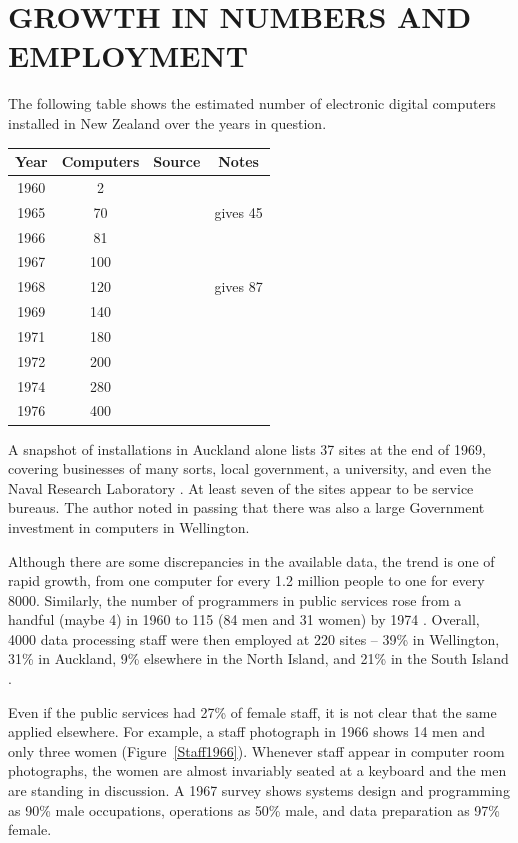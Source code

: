 \documentclass{IEEEcsmag}
\begin{document}
\vspace*{-8pt}
\section{GROWTH IN NUMBERS AND EMPLOYMENT}

The following table shows the estimated number of electronic digital computers installed in New Zealand over the years in question.

\begin{center}
\begin{tabular}{ |c|c|c|c| } 
 \hline
 Year & Computers & Source & Notes\\ 
\hline
1960 & 2 & \cite{FirstCinNZ}&\\ 
1965 & 70 & \cite{Beardon} & \cite{HoneHeke} gives 45\\ 
1966 & 81 & \cite{Beardon}&\\
1967 & 100 & \cite{ScottSurvey1967}&\\
1968 & 120 & \cite{Beardon} & \cite{Yearbook75} gives 87\\
1969 & 140 & \cite{Beardon}&\\
1971 & 180 & \cite{Beardon}&\\
1972 & 200 & \cite{Yearbook75}&\\
1974 & 280 & \cite{Beardon}&\\
1976 & 400 & \cite{Beardon}&\\
 \hline
\end{tabular}
\end{center}

A snapshot of installations in Auckland alone lists 37 sites at the end of 1969, covering businesses of many sorts, local government, a university, and even the Naval Research Laboratory \cite{Auburn1971}. At least seven of the sites appear to be service bureaus. The author noted in passing that there was also a large Government investment in computers in Wellington.

Although there are some discrepancies in the available data, the trend is one of rapid growth, from one computer for every 1.2 million people to one for every 8000. Similarly, the number of programmers in public services rose from a handful (maybe 4) in 1960 to 115 (84 men and
31 women) by 1974 \cite{Yearbook75}. Overall, 4000 data processing staff were then employed at  220 sites -- 39\% in Wellington, 31\% in Auckland, 9\% elsewhere in the North Island, and 21\% in the South Island \cite{Beardon}.

Even if the public services had 27\% of female staff, it is not clear that the same applied elsewhere. For example, a staff photograph in 1966 shows 14 men and only three women (Figure~\ref{Staff1966}). Whenever staff appear in computer room photographs, the women are almost invariably seated at a keyboard and the men are standing in discussion. A 1967 survey \cite{ScottSurvey1967} shows systems design and programming as 90\% male occupations, operations as 50\% male, and data preparation as 97\% female.
\end{document}
